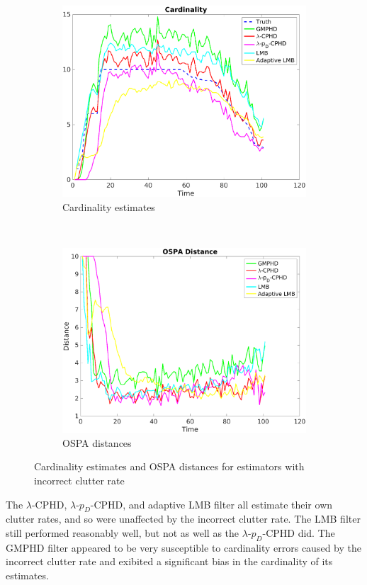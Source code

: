 \documentclass{article}
\newcommand{\lcphd}{$\lambda$-CPHD}
\newcommand{\lpdcphd}{$\lambda$-$p_D$-CPHD}
\begin{document}
\begin{figure}[H]
  \centering
  \begin{subfigure}[t]{0.49\textwidth}
    \centering
    \includegraphics[width=1\linewidth]{low_clutter/cardinality.png}
    \caption{Cardinality estimates}
  \end{subfigure}%
  ~ 
  \begin{subfigure}[t]{0.49\textwidth}
    \centering
    \includegraphics[width=1\linewidth]{low_clutter/ospa.png}
    \caption{OSPA distances}
  \end{subfigure}
\caption{Cardinality estimates and OSPA distances for estimators with incorrect clutter rate}
\end{figure}
The \lcphd{}, \lpdcphd{}, and adaptive LMB filter all estimate their own clutter rates, and so were unaffected by the incorrect clutter rate. The LMB filter still performed reasonably well, but not as well as the \lpdcphd{} did. The GMPHD filter appeared to be very susceptible to cardinality errors caused by the incorrect clutter rate and exibited a significant bias in the cardinality of its estimates.
\end{document}
